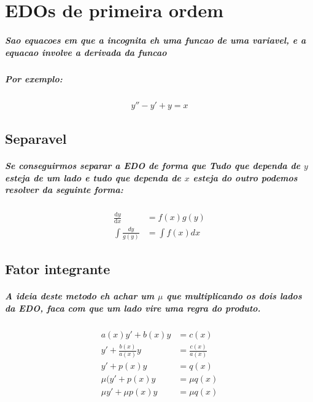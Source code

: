 \documentclass[12pt,twoside, a4paper, twocolumn]{article}
\newcommand\deriv[2]{\frac{\mathrm d #1}{\mathrm d #2}}
\begin{document}
\section{EDOs de primeira ordem}

\subparagraph*{Sao equacoes em que a incognita eh uma funcao de uma variavel, e a equacao involve a derivada da funcao}

\subparagraph*{Por exemplo:}

\begin{equation*}
    \begin{aligned}
        y'' - y' + y = x
    \end{aligned}
\end{equation*}

\subsection{Separavel}
\subparagraph*{Se conseguirmos separar a EDO de forma que Tudo que dependa de $y$ esteja de um lado e tudo que dependa de $x$ esteja do outro podemos resolver da seguinte forma:}

\begin{equation}
    \begin{aligned}
        \deriv{y}{x}         & = f(x)g(y)    \\
        \int \frac{dy}{g(y)} & = \int f(x)dx
    \end{aligned}
\end{equation}

\subsection{Fator integrante}

\subparagraph*{A ideia deste metodo eh achar um $\mu$ que multiplicando os dois lados da EDO, faca com que um lado vire uma regra do produto. }

\begin{equation}
    \begin{aligned}
        a(x)y' + b(x)y          & = c(x)               \\
        y' + \frac{b(x)}{a(x)}y & =  \frac{c(x)}{a(x)} \\
        y' + p(x)y              & = q(x)               \\
        \mu(y' + p(x)y          & = \mu q(x)           \\
        \mu y' + \mu p(x)y      & = \mu q(x)           \\
    \end{aligned}
\end{equation}
\end{document}
